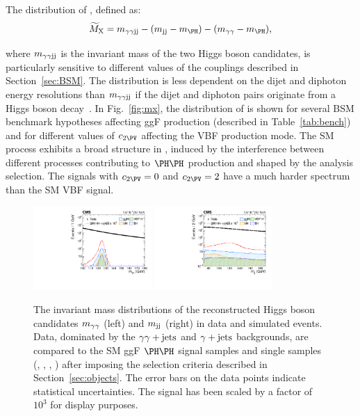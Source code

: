 \documentclass[11pt,twoside,a4paper,cmspaper,final,collab]{cms-tdr}
\begin{document}
The distribution of \Mtilde, defined as:
\begin{equation}
\Mtilde = \Mggjj - (\Mjj - \mH) - (\Mgg - \mH),
\end{equation}

where $m_{\gamma\gamma \text{jj}}$ is the invariant mass of the two Higgs boson candidates, is particularly sensitive to different values of the couplings described in Section~\ref{sec:BSM}.
The \Mtilde distribution is less dependent on the dijet and diphoton energy resolutions than $m_{\gamma\gamma \text{jj}}$ if the dijet and diphoton pairs originate from a Higgs boson decay~\cite{Kumar:2014bca}. 
In Fig.~\ref{fig:mx}, the distribution of \Mtilde is shown for several BSM benchmark hypotheses affecting ggF \HH production (described in Table~\ref{tab:bench}) and for different values of $\ctwov$ affecting the VBF \HH production mode. The SM \HH process exhibits a broad structure in \Mtilde, induced by the interference between different processes contributing to $\HH$ production and shaped by the analysis selection. The signals with $\ctwov=0$ and $\ctwov=2$ have a much harder spectrum than the SM VBF \HH signal.

\begin{figure}[hbt!]
\centering
\includegraphics[width=0.4\textwidth]{Figure_003-a.pdf}
\includegraphics[width=0.4\textwidth]{Figure_003-b.pdf}
\caption{ 
The invariant mass distributions of the reconstructed Higgs boson candidates $m_{\gamma\gamma}$ (left) and $m_\text{jj}$ (right)
 in data and simulated events. Data, dominated by the $\gamma\gamma+\text{jets}$ and $\gamma+\text{jets}$ backgrounds, are compared to the SM ggF $\HH$ signal samples and single \PH samples (\ttH, \ggH, \VBFH, \VH) after imposing the selection criteria described in Section~\ref{sec:objects}. The error bars on the data points indicate statistical uncertainties. The \HH signal has been scaled by a factor of $10^{3}$ for display purposes. }
\label{fig:masses}\end{figure}
\end{document}
